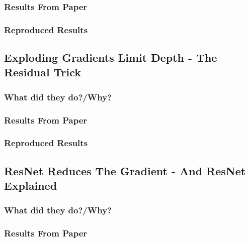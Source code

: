 \documentclass{article} %
\begin{document}
\subsubsection{Results From Paper}



\subsubsection{Reproduced Results}



\vspace{5mm}

\subsection{Exploding Gradients Limit Depth - The Residual Trick}

\subsubsection{What did they do?/Why?}



\subsubsection{Results From Paper}



\subsubsection{Reproduced Results}



\vspace{5mm}

\subsection{ResNet Reduces The Gradient - And ResNet Explained}

\subsubsection{What did they do?/Why?}



\subsubsection{Results From Paper}
\end{document}
